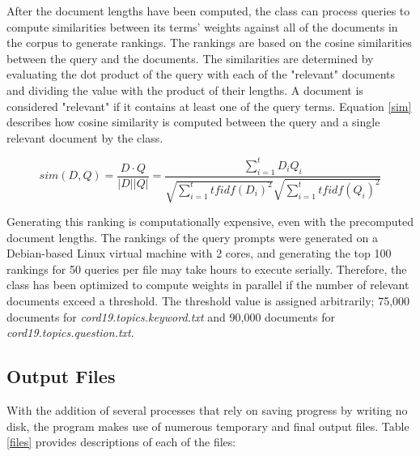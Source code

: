 \documentclass[11pt]{article}
\begin{document}
After the document lengths have been computed, the class can process queries to compute similarities between its terms' weights against all of the documents in the corpus to generate rankings. The rankings are based on the cosine similarities between the query and the documents. The similarities are determined by evaluating the dot product of the query with each of the "relevant" documents and dividing the value with the product of their lengths. A document is considered "relevant" if it contains at least one of the query terms. Equation \ref{sim} describes how cosine similarity is computed between the query and a single relevant document by the class. 

\begin{equation} \label{sim}
    sim(D, Q) = \frac{D \cdot Q}{|D||Q|} = \frac{\sum_{i=1}^{t}{D_iQ_i}}{\sqrt{\sum_{i=1}^{t}{tfidf(D_i)^2}}\sqrt{\sum_{i=1}^{t}{tfidf(Q_i)^2}}}
\end{equation}

Generating this ranking is computationally expensive, even with the precomputed document lengths. The rankings of the query prompts were generated on a Debian-based Linux virtual machine with 2 cores, and generating the top 100 rankings for 50 queries per file may take hours to execute serially. Therefore, the class has been optimized to compute weights in parallel if the number of relevant documents exceed a threshold. The threshold value is assigned arbitrarily; 75,000 documents for \textit{cord19.topics.keyword.txt} and 90,000 documents for \textit{cord19.topics.question.txt}.

\subsection{Output Files}
With the addition of several processes that rely on saving progress by writing no disk, the program makes use of numerous temporary and final output files. Table \ref{files} provides descriptions of each of the files:
\end{document}
